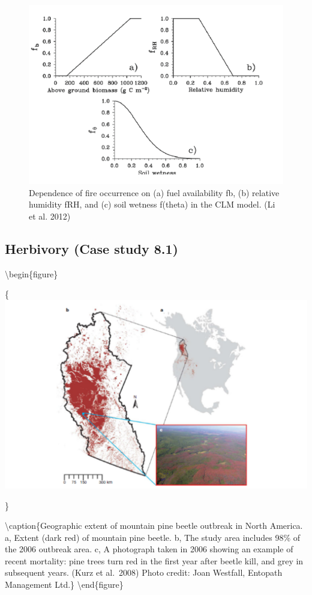 \documentclass[
  12pt,
  oneside]{book}
\begin{document}
\begin{figure}

{\centering \includegraphics[width=0.8\linewidth]{figures/chap8/f89_CLM_fire_relations} 

}

\caption{Dependence of fire occurrence on (a) fuel availability fb, (b) relative humidity fRH, and (c) soil wetness f(theta) in the CLM model. (Li et al. 2012)}\label{fig:f89}
\end{figure}

\hypertarget{herbivory-case-study-8.1}{%
\subsection{Herbivory (Case study 8.1)}\label{herbivory-case-study-8.1}}

\textbackslash begin\{figure\}

\{\centering \includegraphics[width=0.8\linewidth]{figures/chap8/f810_Kurz1}

\}

\textbackslash caption\{Geographic extent of mountain pine beetle outbreak in North America. a, Extent (dark red) of mountain pine beetle. b, The study area includes 98\% of the 2006 outbreak area. c, A photograph taken in 2006 showing an example of recent mortality: pine trees turn red in the first year after beetle kill, and grey in subsequent years. (Kurz et al.~2008) Photo credit: Joan Westfall, Entopath Management Ltd.\}\label{fig:f810}
\textbackslash end\{figure\}
\end{document}
